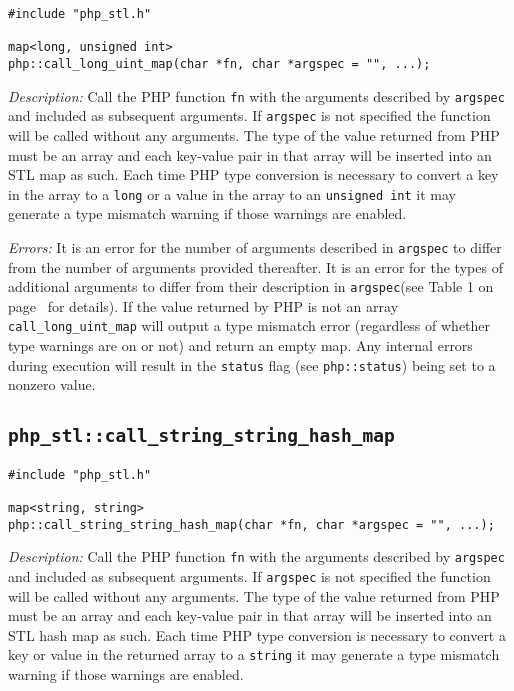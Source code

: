 \documentclass[11pt,titlepage]{article}
\begin{document}
\begin{verbatim}
#include "php_stl.h"

map<long, unsigned int> 
php::call_long_uint_map(char *fn, char *argspec = "", ...);
\end{verbatim}

\emph{Description:} Call the PHP function \verb|fn| with the arguments described by \verb|argspec| and included as subsequent arguments. If \verb|argspec| is not specified the function will be called without any arguments. The type of the value returned from PHP must be an array and each key-value pair in that array will be inserted into an STL map as such. Each time PHP type conversion is necessary to convert a key in the array to a \verb|long| or a value in the array to an \verb|unsigned int| it may generate a type mismatch warning if those warnings are enabled.

\emph{Errors:} It is an error for the number of arguments described in \verb|argspec| to differ from the number of arguments provided thereafter. It is an error for the types of additional arguments to differ from their description in \verb|argspec|(see Table 1 on page~\pageref{Table1} for details). If the value returned by PHP is not an array \verb|call_long_uint_map| will output a type mismatch error (regardless of whether type warnings are on or not) and return an empty map. Any internal errors during execution will result in the \verb|status| flag (see \verb|php::status|) being set to a nonzero value.


\subsection{\texttt{php\_stl::call\_string\_string\_hash\_map}}

\begin{verbatim}
#include "php_stl.h"

map<string, string> 
php::call_string_string_hash_map(char *fn, char *argspec = "", ...);
\end{verbatim}

\emph{Description:} Call the PHP function \verb|fn| with the arguments described by \verb|argspec| and included as subsequent arguments. If \verb|argspec| is not specified the function will be called without any arguments. The type of the value returned from PHP must be an array and each key-value pair in that array will be inserted into an STL hash map as such. Each time PHP type conversion is necessary to convert a key or value in the returned array to a \verb|string| it may generate a type mismatch warning if those warnings are enabled.
\end{document}

